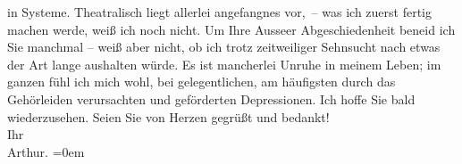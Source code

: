 \begin{ledgroupsized}[t]{13cm}
                    in Systeme. Theatralisch
                    liegt allerlei angefangnes vor, – was ich zuerst fertig machen werde, weiß ich
                    noch nicht.\pend
           \pstart
           Um Ihre Ausseer Abgeschiedenheit beneid ich Sie
                    manchmal – weiß aber nicht, ob ich  trotz
                    zeitweiliger Sehnsucht nach etwas der Art lange aushalten würde. Es ist
                    mancherlei Unruhe in meinem Leben; im ganzen fühl ich mich wohl, bei
                    gelegentlichen, am häufigsten durch das Gehörleiden verursachten und geförderten
                    Depressionen.\pend
           \pstart
           Ich hoffe Sie bald wiederzusehen.\pend
           \pstart
           Seien Sie von Herzen gegrüßt und bedankt!{\\[\baselineskip]}Ihr{\\[\baselineskip]}\spacefill\mbox{Arthur.}\pend
           \leftskip=0em{}
         
         \endnumbering{}\end{ledgroupsized}  \newcommand{\dateiname}{L02455}\newcommand{\titel}{Arthur Schnitzler an Hugo Hofmannsthal, 16. 11. 1925}\newcommand{\editorInnen}{Martin Anton Müller und Gerd-Hermann Susen}
      